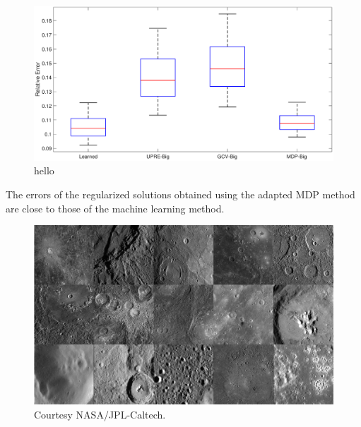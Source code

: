 \documentclass[12pt]{article}
\begin{document}
\begin{figure}[ht]
\includegraphics[scale=0.36]{Figures/Errors2D_mri}
\caption{hello}
\label{fig:Errors 2D}
\end{figure}
The errors of the regularized solutions obtained using the adapted MDP method are close to those of the machine learning method.

\begin{figure}
\label{fig:MESSENGER True}
\includegraphics[scale=0.36]{Figures/MESSENGER}
\caption{Courtesy NASA/JPL-Caltech.}
\end{figure}
\end{document}
